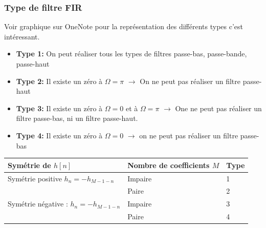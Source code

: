 \documentclass{article}
\theoremstyle{plain}%
\theoremstyle{definition}
\theoremstyle{remark}
\begin{document}
\subsubsection{Type de filtre FIR}
Voir graphique sur OneNote pour la représentation des différents types c'est intéressant.
\begin{itemize}
    \item \textbf{Type 1:} On peut réaliser tous les types de filtres passe-bas, passe-bande, passe-haut
    \item \textbf{Type 2:} Il existe un zéro à $ \Omega = \pi  $ $\rightarrow$ On ne peut pas réaliser un filtre passe-haut
    \item \textbf{Type 3:} Il existe un zéro à $ \Omega = 0 $ et à $ \Omega = \pi  $ $\rightarrow$ One ne peut pas réaliser un filtre passe-bas, ni un filtre passe-haut.
    \item \textbf{Type 4:} Il existe un zéro à $ \Omega = 0 $ $\rightarrow$ on ne peut pas réaliser un filtre passe-bas
\end{itemize}
\begin{table}[!ht]
    \centering
    \begin{tabular}{|l|l|l|}
    \hline
        Symétrie de $h[n]$ & Nombre de coefficients $M$ & Type \\ \hline
        Symétrie positive $ h_n = - h_{M-1-n} $ & Impaire & 1 \\ \hline
        ~ & Paire & 2 \\ \hline
        Symétrie négative : $ h_n = - h_{M-1-n} $  & Impaire & 3 \\ \hline
        ~ & Paire & 4 \\ \hline
    \end{tabular}
\end{table}
\end{document}
